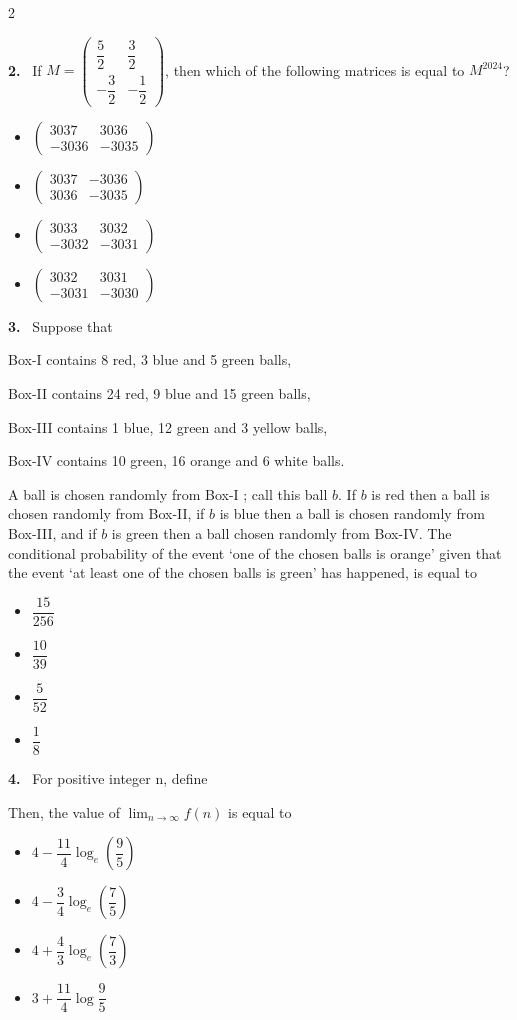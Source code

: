 \documentclass[10pt]{extarticle}
\newcommand{\qn}[1]{\par\smallskip\noindent\textbf{#1.}~}
\newenvironment{qoptions}{\begin{itemize}[leftmargin=1.8em,itemsep=1pt,topsep=2pt,label={}]}{\end{itemize}}
\newcommand{\opt}[2]{\item[(#1)] #2}
\begin{document}
\begin{multicols}{2}
\qn{2} If $M=\begin{pmatrix}\dfrac52 & \dfrac32\\[4pt] -\dfrac32 & -\dfrac12\end{pmatrix}$, then which of the following matrices is equal to $M^{2024}$?
\begin{qoptions}
\opt{A}{$\begin{pmatrix}3037 & 3036\\ -3036 & -3035\end{pmatrix}$}
\opt{B}{$\begin{pmatrix}3037 & -3036\\ 3036 & -3035\end{pmatrix}$}
\opt{C}{$\begin{pmatrix}3033 & 3032\\ -3032 & -3031\end{pmatrix}$}
\opt{D}{$\begin{pmatrix}3032 & 3031\\ -3031 & -3030\end{pmatrix}$}
\end{qoptions}

\qn{3} Suppose that

Box-I contains 8 red, 3 blue and 5 green balls,

Box-II contains 24 red, 9 blue and 15 green balls,

Box-III contains 1 blue, 12 green and 3 yellow balls,

Box-IV contains 10 green, 16 orange and 6 white balls.

A ball is chosen randomly from Box-I ; call this ball $b$. If $b$ is red then a ball is chosen randomly from Box-II, if $b$ is blue then a ball is chosen randomly from Box-III, and if $b$ is green then a ball chosen randomly from Box-IV. The conditional probability of the event `one of the chosen balls is orange' given that the event `at least one of the chosen balls is green' has happened, is equal to
\begin{qoptions}
\opt{A}{$\dfrac{15}{256}$}
\opt{B}{$\dfrac{10}{39}$}
\opt{C}{$\dfrac{5}{52}$}
\opt{D}{$\dfrac18$}
\end{qoptions}

\qn{4} For positive integer n, define
\par\noindent{}\par
Then, the value of $\displaystyle\lim_{n\to\infty} f(n)$ is equal to
\begin{qoptions}
\opt{A}{$4-\dfrac{11}{4}\log_e\left(\dfrac95\right)$}
\opt{B}{$4-\dfrac34\log_e\left(\dfrac75\right)$}
\opt{C}{$4+\dfrac43\log_e\left(\dfrac73\right)$}
\opt{D}{$3+\dfrac{11}{4}\log\dfrac95$}
\end{qoptions}


\end{multicols}
\end{document}
